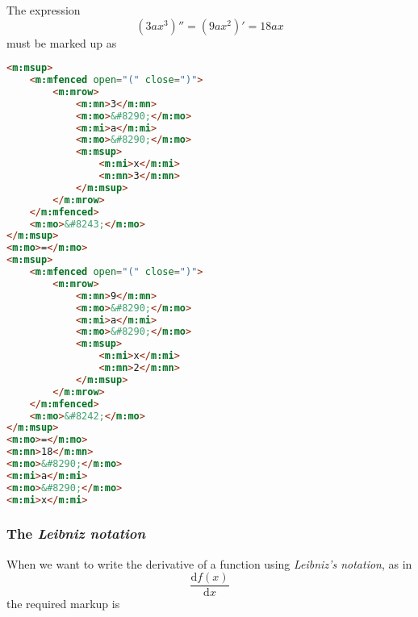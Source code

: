 \documentclass[english,a4paper,11pt]{article}
\begin{document}

\begin{examples}
The expression 
\begin{equation}
(3 a x^3)'' = (9 ax^2)' = 18 a x
\end{equation}
must be marked up as
\begin{lstlisting}[language=HTML]
<m:msup>
	<m:mfenced open="(" close=")">
		<m:mrow>
			<m:mn>3</m:mn>
			<m:mo>&#8290;</m:mo>
			<m:mi>a</m:mi>
			<m:mo>&#8290;</m:mo>
			<m:msup>
				<m:mi>x</m:mi>
				<m:mn>3</m:mn>
			</m:msup>
		</m:mrow>
	</m:mfenced>
	<m:mo>&#8243;</m:mo>
</m:msup>
<m:mo>=</m:mo>
<m:msup>
	<m:mfenced open="(" close=")">
		<m:mrow>
			<m:mn>9</m:mn>
			<m:mo>&#8290;</m:mo>
			<m:mi>a</m:mi>
			<m:mo>&#8290;</m:mo>
			<m:msup>
				<m:mi>x</m:mi>
				<m:mn>2</m:mn>
			</m:msup>
		</m:mrow>
	</m:mfenced>
	<m:mo>&#8242;</m:mo>
</m:msup>
<m:mo>=</m:mo>
<m:mn>18</m:mn>
<m:mo>&#8290;</m:mo>
<m:mi>a</m:mi>
<m:mo>&#8290;</m:mo>
<m:mi>x</m:mi>
\end{lstlisting}


\end{examples}

\subsubsection{The \emph{Leibniz notation}}
When we want to write the derivative of a function using \emph{Leibniz's notation}, as in
\begin{equation}
\frac{\text{d}f(x)}{\text{d}x}
\end{equation}
the required markup is
\end{document}

